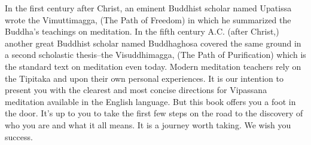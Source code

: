 In the first century after Christ, an eminent Buddhist scholar named Upatissa
wrote the Vimuttimagga, (The Path of Freedom) in which he summarized the
Buddha's teachings on meditation. In the fifth century A.C. (after Christ,)
another great Buddhist scholar named Buddhaghosa covered the same ground in a
second scholastic thesis--the Visuddhimagga, (The Path of Purification) which is
the standard text on meditation even today. Modern meditation teachers rely on
the Tipitaka and upon their own personal experiences. It is our intention to
present you with the clearest and most concise directions for Vipassana
meditation available in the English language. But this book offers you a foot in
the door. It's up to you to take the first few steps on the road to the
discovery of who you are and what it all means. It is a journey worth taking. We
wish you success.


